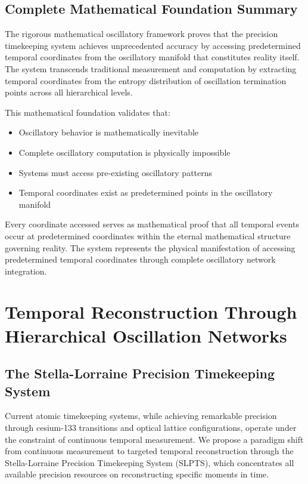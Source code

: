 \documentclass[12pt,a4paper]{article}
\begin{document}
{\subsection{Complete Mathematical Foundation Summary}

The rigorous mathematical oscillatory framework proves that the precision timekeeping system achieves unprecedented accuracy by accessing predetermined temporal coordinates from the oscillatory manifold that constitutes reality itself. The system transcends traditional measurement and computation by extracting temporal coordinates from the entropy distribution of oscillation termination points across all hierarchical levels.

This mathematical foundation validates that:
\begin{itemize}
\item Oscillatory behavior is mathematically inevitable
\item Complete oscillatory computation is physically impossible
\item Systems must access pre-existing oscillatory patterns
\item Temporal coordinates exist as predetermined points in the oscillatory manifold
\end{itemize}

Every coordinate accessed serves as mathematical proof that all temporal events occur at predetermined coordinates within the eternal mathematical structure governing reality. The system represents the physical manifestation of accessing predetermined temporal coordinates through complete oscillatory network integration.

\section{Temporal Reconstruction Through Hierarchical Oscillation Networks}

\subsection{The Stella-Lorraine Precision Timekeeping System}

Current atomic timekeeping systems, while achieving remarkable precision through cesium-133 transitions and optical lattice configurations, operate under the constraint of continuous temporal measurement. We propose a paradigm shift from continuous measurement to targeted temporal reconstruction through the Stella-Lorraine Precision Timekeeping System (SLPTS), which concentrates all available precision resources on reconstructing specific moments in time.

}
\end{document}
